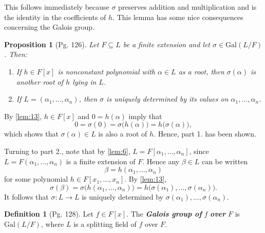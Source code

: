 \documentclass[leqno]{article}
\makeatletter
\theoremstyle{definition}
\newtheorem{prop}{Proposition}
\newtheorem{definition}{Definition}
\theoremstyle{remark}
\let\oldproofname=\proofname
\renewcommand{\proofname}{\textit{\oldproofname}}
\theoremstyle{definition}
\renewenvironment{proof}[1][\proofname]{\par
  \pushQED{\qed}%
  \normalfont \topsep6\p@\@plus6\p@\relax
  \list{}{\leftmargin=0mm
          \rightmargin=0mm
          \settowidth{\itemindent}{\itshape#1}%
          \labelwidth=\itemindent
          \parsep=0pt \listparindent=0mm%
  }
  \item[\hskip\labelsep
        \itshape
    #1\@addpunct{.}]\ignorespaces
}{%
  \popQED\endlist\@endpefalse
}
\makeatother
\begin{document}
        \begin{proof}
            This follows immediately because $\sigma$ preserves addition and multiplication and is the identity in the coefficients of $h$.
        \end{proof}
    This lemma has some nice consequences concerning the Galois group.
    \begin{prop}[Pg. 126]\label{prop:5}
        \textit{Let $F\subseteq L$ be a finite extension and let $\sigma\in\text{Gal}(L/F)$. Then:}
            \begin{enumerate}
                \item \textit{If $h\in F[x]$ is nonconstant polynomial with $\alpha\in L$ as a root, then $\sigma(\alpha)$ is another root of $h$ lying in $L$.}
                \item \textit{If $L=(\alpha_1,\dots,\alpha_n)$, then $\sigma$ is uniquely determined by its values on $\alpha_1,\dots,\alpha_n$.}
            \end{enumerate}
    \end{prop}
        \begin{proof}
            By \cref{lem:13}, $h\in F[x]$ and $0=h(\alpha)$ imply that
                \begin{equation*}
                    0=\sigma(0)=\sigma\big(h(\alpha)\big)=h\big(\sigma(\alpha)\big),
                \end{equation*}
            which shows that $\sigma(\alpha)\in L$ is also a root of $h$. Hence, part 1. has been shown.\par\hspace{4mm} Turning to part 2., note that by \cref{lem:6}, $L=F[\alpha_1,\dots,\alpha_n]$, since $L=F(\alpha_1,\dots,\alpha_n)$ is a finite extension of $F$. Hence any $\beta\in L$ can be written 
                \begin{equation*}
                    \beta=h(\alpha_1,\dots,\alpha_n)
                \end{equation*}
            for some polynomial $h\in F[x_1,\dots, x_n]$. By \cref{lem:13}, 
                \begin{equation*}
                    \sigma(\beta)=\sigma\big(h(\alpha_1,\dots,\alpha_n)\big)=h\big(\sigma(\alpha_1),\dots,\sigma(\alpha_n)\big).
                \end{equation*}
            It follows that $\sigma\colon L\rightarrow L$ is uniquely determined by $\sigma(\alpha_1),\dots,\sigma(\alpha_n)$.
        \end{proof}
    \begin{definition}[Pg. 128]\label{def:10}
        Let $f\in F[x]$. The \textbf{\textit{Galois group of}} $f$ \textbf{\textit{over}} $F$ is $\text{Gal}(L/F)$, where $L$ is a splitting field of $f$ over $F$.
    \end{definition}
\end{document}
